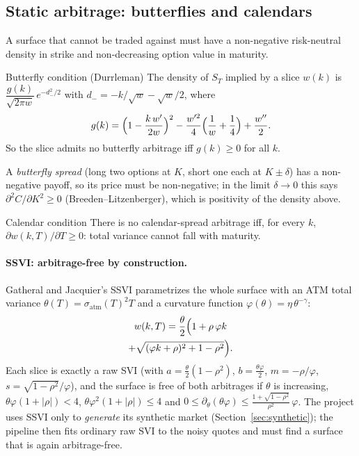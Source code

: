 \documentclass[11pt]{article}
\begin{document}
\subsection{Static arbitrage: butterflies and calendars}

A surface that cannot be traded against must have a non-negative risk-neutral
density in strike and non-decreasing option value in maturity.

\begin{fact}{Butterfly condition (Durrleman)}
The density of $S_T$ implied by a slice $w(k)$ is
$\dfrac{g(k)}{\sqrt{2\pi w}}\,e^{-d_-^2/2}$ with $d_-=-k/\sqrt w-\sqrt w/2$, where
\begin{equation}\label{eq:g}
  g(k)=\Bigl(1-\frac{k\,w'}{2w}\Bigr)^2-\frac{w'^2}{4}\Bigl(\frac1w+\frac14\Bigr)+\frac{w''}{2}.
\end{equation}
So the slice admits no butterfly arbitrage iff $g(k)\ge0$ for all $k$.
\end{fact}

A \emph{butterfly spread} (long two options at $K$, short one each at $K\pm\delta$)
has a non-negative payoff, so its price must be non-negative; in the limit
$\delta\to0$ this says $\partial^2C/\partial K^2\ge0$ (Breeden--Litzenberger),
which is positivity of the density above.

\begin{fact}{Calendar condition}
There is no calendar-spread arbitrage iff, for every $k$,
$\partial w(k,T)/\partial T\ge0$: total variance cannot fall with maturity.
\end{fact}

\paragraph{SSVI: arbitrage-free by construction.} Gatheral and
Jacquier's SSVI parametrizes the whole surface with an ATM total variance
$\theta(T)=\sigma_{\mathrm{atm}}(T)^2T$ and a curvature function
$\varphi(\theta)=\eta\,\theta^{-\gamma}$:
\begin{multline}\label{eq:ssvi}
  w(k,T)=\frac\theta2\Bigl(1+\rho\,\varphi k\\
  +\sqrt{(\varphi k+\rho)^2+1-\rho^2}\Bigr).
\end{multline}
Each slice is exactly a raw SVI (with $a=\tfrac\theta2(1-\rho^2)$,
$b=\tfrac{\theta\varphi}2$, $m=-\rho/\varphi$, $s=\sqrt{1-\rho^2}/\varphi$), and the
surface is free of both arbitrages if $\theta$ is increasing,
$\theta\varphi(1+|\rho|)<4$, $\theta\varphi^2(1+|\rho|)\le4$ and
$0\le\partial_\theta(\theta\varphi)\le\frac{1+\sqrt{1-\rho^2}}{\rho^2}\,\varphi$. The
project uses SSVI only to \emph{generate} its synthetic market
(Section~\ref{sec:synthetic}); the pipeline then fits ordinary raw SVI to the
noisy quotes and must find a surface that is again arbitrage-free.
\end{document}
